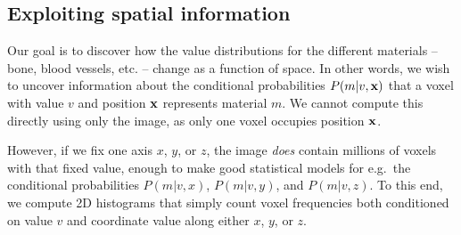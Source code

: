 

\subsection{Exploiting spatial information}
Our goal is to discover how the value distributions for the different materials -- bone, blood vessels, etc. --
change as a function of space. In other words, we wish to uncover information about the conditional probabilities $P(m|v,\mathbf{x})$ that a voxel with value $v$ and
position $\mathbf{x}$ represents material $m$. We cannot compute this directly using only the image, as only one voxel occupies position $\mathbf{x}$. 

However, if we fix one axis $x$, $y$, or $z$, the image {\em does} contain millions of voxels with that fixed value, enough to make good statistical
models for e.g.~the conditional probabilities $P(m|v,x)$, $P(m|v,y)$, and $P(m|v,z)$. To this end, we compute 2D histograms that simply count voxel frequencies
both conditioned on value $v$ and coordinate value along either $x$, $y$, or $z$. 

